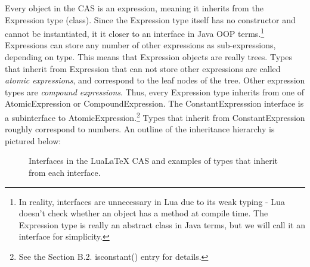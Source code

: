 \documentclass{article}
\begin{document}
Every object in the CAS is an expression, meaning it inherits from the {\ttfamily Expression} type (class). Since the {\ttfamily Expression} type itself has no constructor and cannot be instantiated, it it closer to an interface in Java OOP terms.\footnote{In reality, interfaces are unnecessary in Lua due to its weak typing - Lua doesn't check whether an object has a method at compile time. The {\ttfamily Expression} type is really an abstract class in Java terms, but we will call it an interface for simplicity.} {\ttfamily Expression}s can store any number of other expressions as sub-expressions, depending on type. This means that {\ttfamily Expression} objects are really trees. Types that inherit from {\ttfamily Expression} that can not store other expressions are called \emph{atomic expressions}, and correspond to the leaf nodes of the tree. Other expression types are \emph{compound expressions}. Thus, every {\ttfamily Expression} type inherits from one of {\ttfamily AtomicExpression} or {\ttfamily CompoundExpression}. The {\ttfamily ConstantExpresssion} interface is a subinterface to {\ttfamily AtomicExpression}.\footnote{See the Section B.2. {\ttfamily isconstant()} entry for details.} Types that inherit from {\ttfamily ConstantExpression} roughly correspond to numbers. An outline of the inheritance hierarchy is pictured below:

\begin{figure}[h]
\centering


\caption{Interfaces in the Lua\LaTeX{} CAS and examples of types that inherit from each interface.}

\end{figure}
\end{document}
